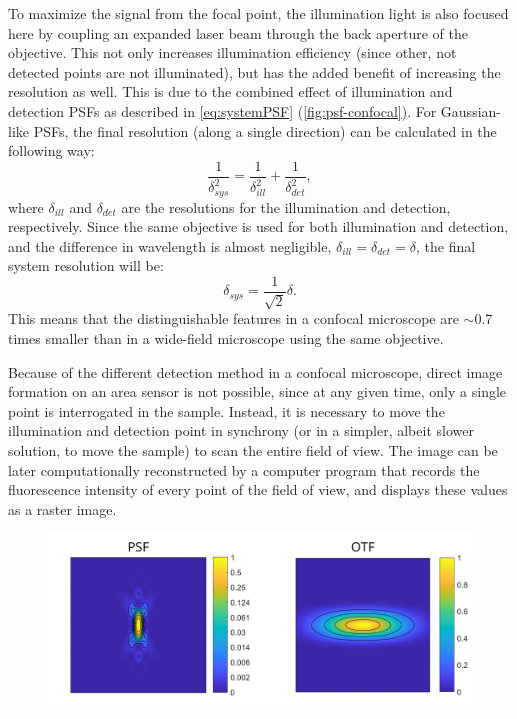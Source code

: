     To maximize the signal from the focal point, the illumination light is also focused here by coupling an expanded laser beam through the back aperture of the objective. This not only increases illumination efficiency (since other, not detected points are not illuminated), but has the added benefit of increasing the resolution as well. This is due to the combined effect of illumination and detection PSFs as described in \autoref{eq:systemPSF} (\autoref{fig:psf-confocal}). For Gaussian-like PSFs, the final resolution (along a single direction) can be calculated in the following way:
    \begin{equation}
      \frac{1}{\delta _{sys}^2} = \frac{1}{\delta _{ill}^2} + \frac{1}{\delta _{det}^2},
      \label{eq:systemRes}
    \end{equation}
    where $\delta_{ill}$ and $\delta_{det}$ are the resolutions for the illumination and detection, respectively. Since the same objective is used for both illumination and detection, and the difference in wavelength is almost negligible, $\delta_{ill} = \delta_{det} = \delta$, the final system resolution will be:
    \begin{equation}
      \delta_{sys} = \frac{1}{\sqrt{2}} \delta.
    \end{equation}
    This means that the distinguishable features in a confocal microscope are $\sim$0.7 times smaller than in a wide-field microscope using the same objective.

    Because of the different detection method in a confocal microscope, direct image formation on an area sensor is not possible, since at any given time, only a single point is interrogated in the sample. Instead, it is necessary to move the illumination and detection point in synchrony (or in a simpler, albeit slower solution, to move the sample) to scan the entire field of view. The image can be later computationally reconstructed by a computer program that records the fluorescence intensity of every point of the field of view, and displays these values as a raster image.


    \begin{figure}
      \centering
      \includegraphics[width=1\textwidth]{psfs/confocal.pdf}
      \label{fig:psf-confocal}
    \end{figure}



